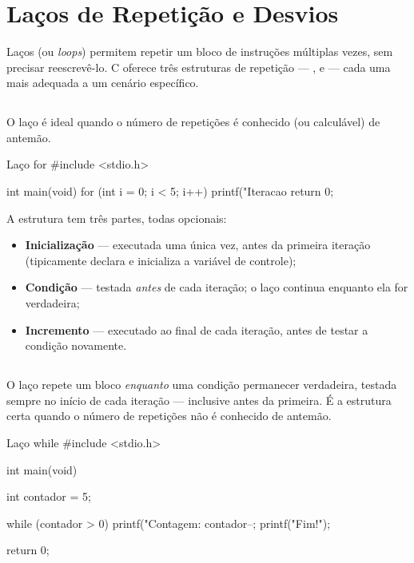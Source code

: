 \chapter{Laços de Repetição e Desvios}
\label{cap:repeticao}

Laços (ou \emph{loops}) permitem repetir um bloco de instruções múltiplas vezes, sem precisar reescrevê-lo. C oferece três estruturas de repetição — ,  e  — cada uma mais adequada a um cenário específico.

\section{}

O laço  é ideal quando o número de repetições é conhecido (ou calculável) de antemão.

\begin{codigoc}{Laço for}
#include <stdio.h>

int main(void) {
    for (int i = 0; i < 5; i++) {
        printf("Iteracao %
    }
    return 0;
}
\end{codigoc}

A estrutura  tem três partes, todas opcionais:

\begin{itemize}
    \item \textbf{Inicialização} — executada uma única vez, antes da primeira iteração (tipicamente declara e inicializa a variável de controle);
    \item \textbf{Condição} — testada \emph{antes} de cada iteração; o laço continua enquanto ela for verdadeira;
    \item \textbf{Incremento} — executado ao final de cada iteração, antes de testar a condição novamente.
\end{itemize}

\section{}

O laço  repete um bloco \emph{enquanto} uma condição permanecer verdadeira, testada sempre no início de cada iteração — inclusive antes da primeira. É a estrutura certa quando o número de repetições não é conhecido de antemão.

\begin{codigoc}{Laço while}
#include <stdio.h>

int main(void) {
    int contador = 5;

    while (contador > 0) {
        printf("Contagem: %
        contador--;
    }
    printf("Fim!\n");

    return 0;
}
\end{codigoc}

